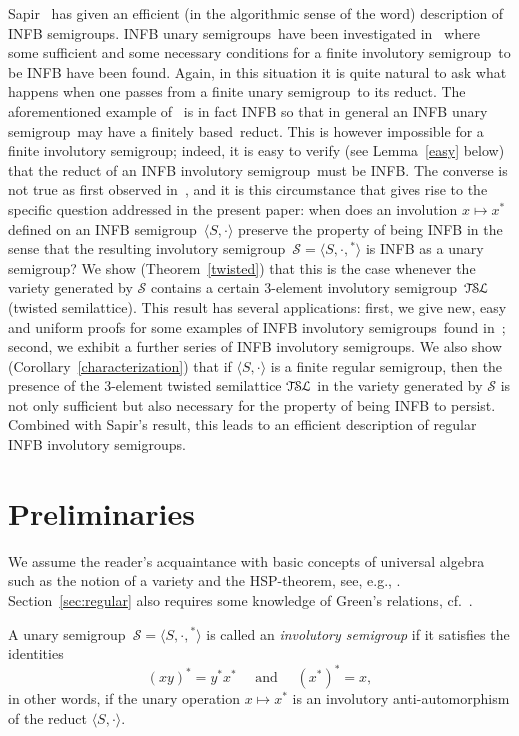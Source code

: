 \documentclass[11pt,reqno]{amsart}
\newcommand{\sgp}{semi\-group}
\newcommand{\sgps}{semi\-groups}
\newcommand{\is}{involutory semi\-group}
\newcommand{\iss}{involutory semi\-groups}
\newcommand{\fis}{finite involutory semi\-group}
\newcommand{\fus}{finite unary \sgp}
\newcommand{\fb}{finitely based}
\newcommand{\TSL}{\ensuremath{\mathcal{T\kern-.5pt S\kern-.5pt L}}}
\begin{document}
Sapir~\cite{Sapir:1987} has given an efficient (in the algorithmic sense of the word) description of INFB \sgps. INFB unary \sgps\ have
been investigated in~\cite{Dolinka:2010,ADV:2012} where some sufficient and some necessary conditions for a \fis\ to be INFB have been
found. Again, in this situation it is quite natural to ask what happens when one passes from a \fus\ to its reduct. The aforementioned
example of~\cite{Lawrence&Willard:1998} is in fact INFB so that in general an INFB unary \sgp\ may have a \fb\ reduct. This is however
impossible for a \fis; indeed, it is easy to verify (see Lemma~\ref{easy} below) that the reduct of an INFB \is\ must be INFB. The converse
is not true as first observed in~\cite{Sapir:1993}, and it is this circumstance that gives rise to the specific question addressed in the
present paper: when does an involution $x\mapsto x^*$ defined on an INFB \sgp\ $\langle S,\cdot\rangle$ preserve the property of being INFB
in the sense that the resulting \is\ $\mathcal{S}=\langle S,\cdot,{}^*\rangle$ is INFB as a unary \sgp?  We show (Theorem~\ref{twisted})
that this is the case whenever the variety generated by $\mathcal{S}$ contains a certain 3-element \is\ $\TSL$ (twisted semilattice). This
result has several applications: first, we give new, easy and uniform proofs for some examples of INFB \iss\ found in~\cite{ADV:2012};
second, we exhibit a further series of INFB \iss. We also show (Corollary~\ref{characterization}) that if $\langle S,\cdot\rangle$ is a finite regular
\sgp, then the presence of the 3-element twisted semilattice $\TSL$ in the variety generated by $\mathcal{S}$ is not only sufficient but
also necessary for the property of being INFB to persist. Combined with Sapir's result, this leads to an efficient description of regular
INFB \iss.

\section{Preliminaries}
\label{sec:preliminaries}

We assume the reader's acquaintance with basic concepts of universal algebra such as the notion of a variety and the HSP-theorem, see,
e.g., \cite[Chapter~II]{BuSa81}. Section~\ref{sec:regular} also requires some knowledge of Green's relations, cf.~\cite[Chapter~2]{how}.

A unary \sgp\ $\mathcal{S}=\langle S,\cdot,{}^*\rangle$ is called an \emph{\is} if it satisfies the identities
\begin{equation}
\label{eq:invlution} (xy)^*=y^*x^* \quad \text{ and  }\quad (x^*)^*=x,
\end{equation}
in other words, if the unary operation $x\mapsto x^*$ is an involutory anti-automorphism of the reduct $\langle S,\cdot\rangle$.
\end{document}
